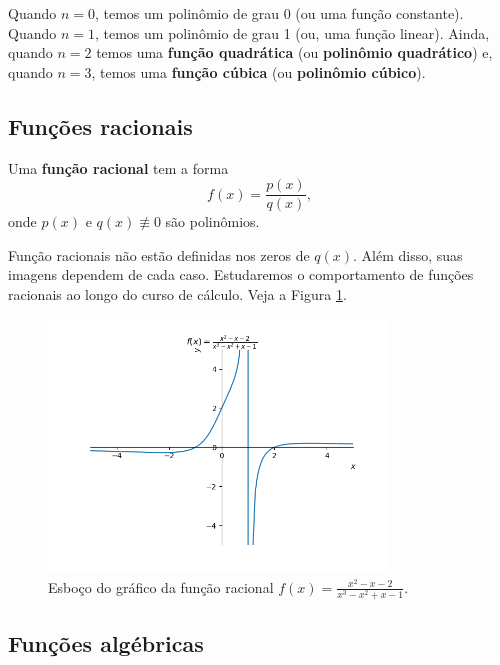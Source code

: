 Quando $n=0$, temos um polinômio de grau 0 (ou uma função constante). Quando $n=1$, temos um polinômio de grau 1 (ou, uma função linear). Ainda, quando $n=2$ temos uma {\bf função quadrática} (ou {\bf polinômio quadrático}) e, quando $n=3$, temos uma {\bf função cúbica} (ou {\bf polinômio cúbico}).

\subsection{Funções racionais}

Uma {\bf função racional} tem a forma
\begin{equation}
  f(x) = \frac{p(x)}{q(x)},
\end{equation}
onde $p(x)$ e $q(x)\not\equiv 0$ são polinômios.

Função racionais não estão definidas nos zeros de $q(x)$. Além disso, suas imagens dependem de cada caso. Estudaremos o comportamento de funções racionais ao longo do curso de cálculo. Veja a Figura \ref{fig:racional_grafico}.

\begin{figure}[H]
  \centering
  \includegraphics[width=0.8\textwidth]{./cap_funcao/dados/fig_racional_grafico/fig_racional_grafico}
  \caption{Esboço do gráfico da função racional $f(x) = \frac{x^{2} - x - 2}{x^{3} - x^{2} + x - 1}$.}
  \label{fig:racional_grafico}
\end{figure}


\subsection{Funções algébricas}

